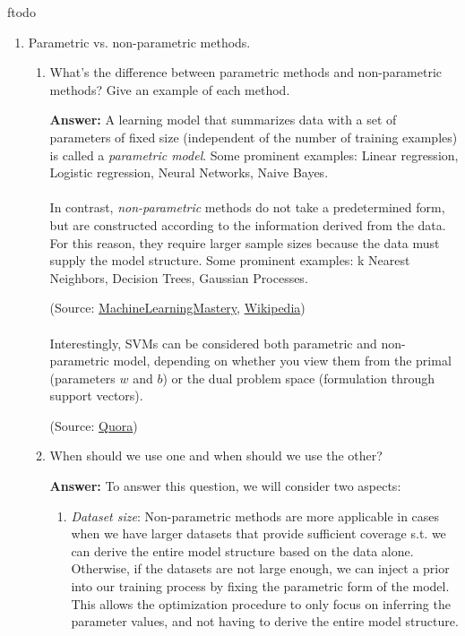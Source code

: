 ƒtodo\documentclass{article}
\newenvironment{QandA}{\begin{enumerate}[label=\arabic*.]}{\end{enumerate}}
\newenvironment{InnerQandA}{\begin{enumerate}[label=\roman*.]}{\end{enumerate}}
\newenvironment{ListAlph}{\begin{enumerate}[label=(\alph*)]}{\end{enumerate}}
\newenvironment{answer}{\par\normalfont \textbf{Answer:}}{}
\begin{document}
\begin{QandA}
    \item Parametric vs. non-parametric methods.
    \begin{InnerQandA}
        \item What’s the difference between parametric methods and non-parametric methods? Give an example of each method.
        \begin{answer}
            A learning model that summarizes data with a set of parameters of fixed size (independent of the number of training examples) is called a \textit{parametric model}. Some prominent examples: Linear regression, Logistic regression, Neural Networks, Naive Bayes. \\\\
            In contrast, \textit{non-parametric} methods do not take a predetermined form, but are constructed according to the information derived from the data. For this reason, they require larger sample sizes because the data must supply the model structure. Some prominent examples: k Nearest Neighbors, Decision Trees, Gaussian Processes.

            (Source: \href{https://machinelearningmastery.com/parametric-and-nonparametric-machine-learning-algorithms/}{MachineLearningMastery}, \href{https://en.wikipedia.org/wiki/Nonparametric_regression}{Wikipedia}) \\\\
            Interestingly, SVMs can be considered both parametric and non-parametric model, depending on whether you view them from the primal (parameters $w$ and $b$) or the dual problem space (formulation through support vectors). 

            (Source: \href{https://www.quora.com/Do-Support-Vector-Machines-come-under-parametric-or-non-parametric-models-and-why}{Quora})
        \end{answer}

        \item When should we use one and when should we use the other?
        \begin{answer}
            To answer this question, we will consider two aspects:
            \begin{ListAlph}
                \item \textit{Dataset size}: Non-parametric methods are more applicable in cases when we have larger datasets that provide sufficient coverage s.t. we can derive the entire model structure based on the data alone. Otherwise, if the datasets are not large enough, we can inject a prior into our training process by fixing the parametric form of the model. This allows the optimization procedure to only focus on inferring the parameter values, and not having to derive the entire model structure.


\end{ListAlph}
\end{answer}
\end{InnerQandA}
\end{QandA}
\end{document}
